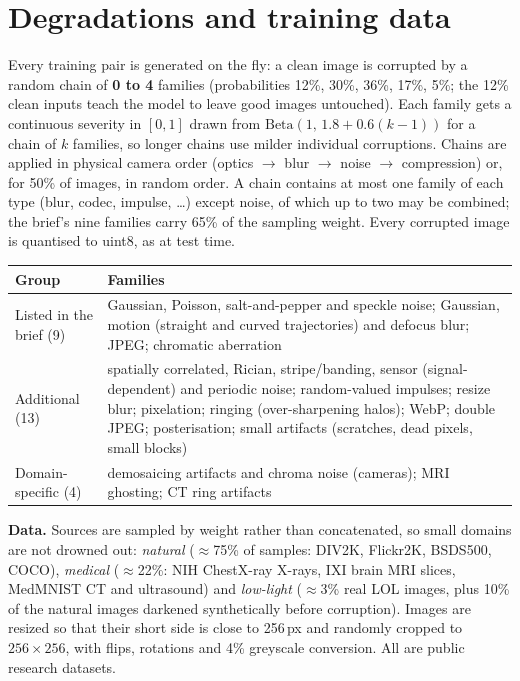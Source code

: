 \documentclass[10pt,a4paper]{article}
\begin{document}
\section{Degradations and training data}
Every training pair is generated on the fly: a clean image is corrupted by a random chain of
\textbf{0 to 4} families (probabilities 12\%, 30\%, 36\%, 17\%, 5\%; the 12\% clean inputs teach
the model to leave good images untouched). Each family gets a continuous severity in $[0,1]$ drawn from
$\mathrm{Beta}(1,\,1.8+0.6(k-1))$ for a chain of $k$ families, so longer chains use milder
individual corruptions. Chains are applied in physical camera order (optics $\rightarrow$ blur
$\rightarrow$ noise $\rightarrow$ compression) or, for 50\% of images, in random order. A chain contains at most one family of each type (blur, codec, impulse, \dots) except noise,
of which up to two may be combined; the brief's nine families carry 65\% of the sampling
weight. Every corrupted image is quantised to uint8, as at test time.

\begin{center}
\small
\begin{tabularx}{\linewidth}{@{}p{3.6cm}Y@{}}
\toprule
\textbf{Group} & \textbf{Families} \\
\midrule
Listed in the brief (9) & Gaussian, Poisson, salt-and-pepper and speckle noise; Gaussian, motion
  (straight and curved trajectories) and defocus blur; JPEG; chromatic aberration \\
Additional (13) & spatially correlated, Rician, stripe/banding, sensor (signal-dependent) and
  periodic noise; random-valued impulses; resize blur; pixelation; ringing (over-sharpening halos); WebP; double JPEG;
  posterisation; small artifacts (scratches, dead pixels, small blocks) \\
Domain-specific (4) & demosaicing artifacts and chroma noise (cameras); MRI ghosting; CT ring
  artifacts \\
\bottomrule
\end{tabularx}
\end{center}

\textbf{Data.} Sources are sampled by weight rather than concatenated, so small domains are not
drowned out: \emph{natural} ($\approx$75\% of samples: DIV2K, Flickr2K, BSDS500, COCO), \emph{medical}
($\approx$22\%: NIH ChestX-ray X-rays, IXI brain MRI slices, MedMNIST CT and ultrasound) and
\emph{low-light} ($\approx$3\% real LOL images, plus 10\% of the natural images darkened
synthetically before corruption). Images
are resized so that their short side is close to 256\,px and randomly cropped to
$256\times256$, with flips, rotations and 4\% greyscale conversion. All are public research
datasets.
\end{document}

